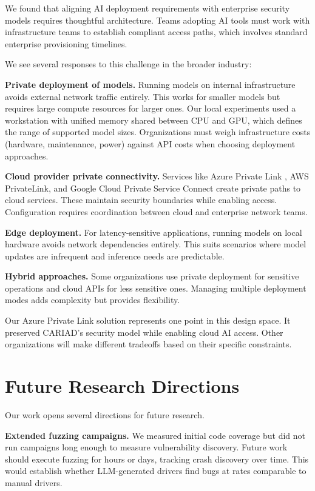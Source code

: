 We found that aligning AI deployment requirements with enterprise security models requires thoughtful architecture. Teams adopting AI tools must work with infrastructure teams to establish compliant access paths, which involves standard enterprise provisioning timelines.

We see several responses to this challenge in the broader industry:

\textbf{Private deployment of models.} Running models on internal infrastructure avoids external network traffic entirely. This works for smaller models but requires large compute resources for larger ones. Our local experiments used a workstation with unified memory shared between CPU and GPU, which defines the range of supported model sizes. Organizations must weigh infrastructure costs (hardware, maintenance, power) against API costs when choosing deployment approaches.

\textbf{Cloud provider private connectivity.} Services like Azure Private Link \cite{azure_private_link}, AWS PrivateLink, and Google Cloud Private Service Connect create private paths to cloud services. These maintain security boundaries while enabling access. Configuration requires coordination between cloud and enterprise network teams.

\textbf{Edge deployment.} For latency-sensitive applications, running models on local hardware avoids network dependencies entirely. This suits scenarios where model updates are infrequent and inference needs are predictable.

\textbf{Hybrid approaches.} Some organizations use private deployment for sensitive operations and cloud APIs for less sensitive ones. Managing multiple deployment modes adds complexity but provides flexibility.

Our Azure Private Link solution represents one point in this design space. It preserved CARIAD's security model while enabling cloud AI access. Other organizations will make different tradeoffs based on their specific constraints.


\section{Future Research Directions}
\label{sec:discussion_future}

Our work opens several directions for future research.

\textbf{Extended fuzzing campaigns.} We measured initial code coverage but did not run campaigns long enough to measure vulnerability discovery. Future work should execute fuzzing for hours or days, tracking crash discovery over time. This would establish whether LLM-generated drivers find bugs at rates comparable to manual drivers.

